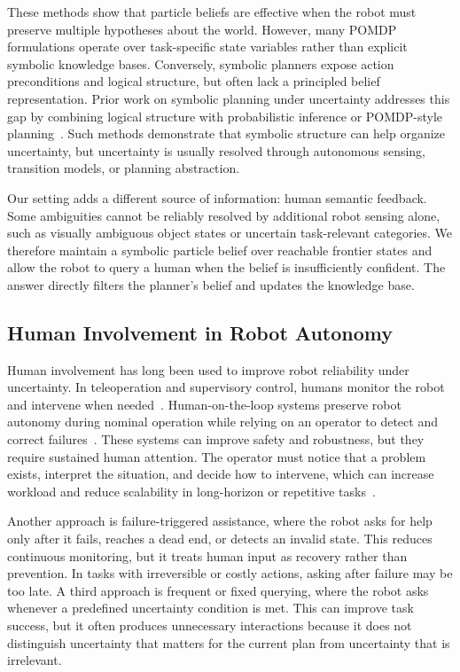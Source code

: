 These methods show that particle beliefs are effective when the robot must preserve multiple hypotheses about the world. However, many POMDP formulations operate over task-specific state variables rather than explicit symbolic knowledge bases. Conversely, symbolic planners expose action preconditions and logical structure, but often lack a principled belief representation. Prior work on symbolic planning under uncertainty addresses this gap by combining logical structure with probabilistic inference or POMDP-style planning~\cite{sanner2010symbolic,zhang2015corpp,serrano2021knowledge}. Such methods demonstrate that symbolic structure can help organize uncertainty, but uncertainty is usually resolved through autonomous sensing, transition models, or planning abstraction.

Our setting adds a different source of information: human semantic feedback. Some ambiguities cannot be reliably resolved by additional robot sensing alone, such as visually ambiguous object states or uncertain task-relevant categories. We therefore maintain a symbolic particle belief over reachable frontier states and allow the robot to query a human when the belief is insufficiently confident. The answer directly filters the planner's belief and updates the knowledge base.

\subsection{Human Involvement in Robot Autonomy}
\label{sec:related_human_loop}

Human involvement has long been used to improve robot reliability under uncertainty. In teleoperation and supervisory control, humans monitor the robot and intervene when needed~\cite{goodrich2008human,dragan2013legibility}. Human-on-the-loop systems preserve robot autonomy during nominal operation while relying on an operator to detect and correct failures~\cite{scharre2015introduction,nahavandi2017trusted,kelly2019hg,mandlekar2020human}. These systems can improve safety and robustness, but they require sustained human attention. The operator must notice that a problem exists, interpret the situation, and decide how to intervene, which can increase workload and reduce scalability in long-horizon or repetitive tasks~\cite{endsley2018automation,wong2017workload}.

Another approach is failure-triggered assistance, where the robot asks for help only after it fails, reaches a dead end, or detects an invalid state. This reduces continuous monitoring, but it treats human input as recovery rather than prevention. In tasks with irreversible or costly actions, asking after failure may be too late. A third approach is frequent or fixed querying, where the robot asks whenever a predefined uncertainty condition is met. This can improve task success, but it often produces unnecessary interactions because it does not distinguish uncertainty that matters for the current plan from uncertainty that is irrelevant.

